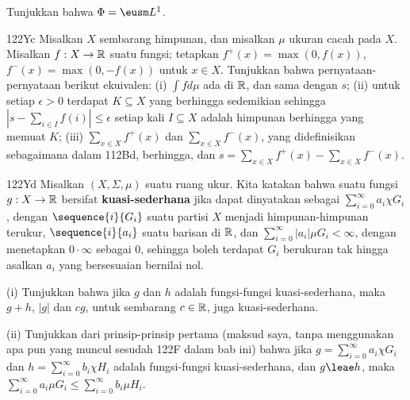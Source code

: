 {

\noindent Tunjukkan bahwa $\Phi=\eusm L^1$. 

\spheader 122Yc Misalkan $X$ sembarang himpunan, dan misalkan $\mu$
ukuran cacah pada $X$. Misalkan $f:X\to\Bbb R$ suatu fungsi; tetapkan
$f^+(x)=\max(0,f(x))$, $f^-(x)=\max(0,-f(x))$ untuk $x\in X$.
Tunjukkan bahwa pernyataan-pernyataan berikut ekuivalen: (i)
$\int fd\mu$ ada di $\Bbb R$, dan sama dengan $s$; (ii) untuk setiap
$\epsilon>0$ terdapat $K\subseteq X$ yang berhingga sedemikian sehingga
$|s-\sum_{i\in I}f(i)|\le\epsilon$ setiap kali $I\subseteq X$ adalah
himpunan berhingga yang memuat $K$; (iii) $\sum_{x\in X}f^+(x)$ dan
$\sum_{x\in X}f^-(x)$, yang didefinisikan sebagaimana dalam 112Bd,
berhingga, dan
$s=\sum_{x\in X}f^+(x)-\sum_{x\in X}f^-(x)$.

\spheader 122Yd Misalkan $(X,\Sigma,\mu)$ suatu ruang ukur. Kita katakan
bahwa suatu fungsi $g:X\to\Bbb R$ bersifat {\bf kuasi-sederhana} jika
dapat dinyatakan sebagai $\sum_{i=0}^{\infty}a_i\chi G_i$, dengan
$\sequence{i}{G_i}$ suatu partisi $X$ menjadi himpunan-himpunan terukur,
$\sequence{i}{a_i}$ suatu barisan di $\Bbb R$, dan
$\sum_{i=0}^{\infty}|a_i|\mu G_i<\infty$, dengan menetapkan
$0\cdot\infty$ sebagai $0$, sehingga boleh terdapat $G_i$ berukuran tak
hingga asalkan $a_i$ yang bersesuaian bernilai nol.

\quad(i) Tunjukkan bahwa jika $g$ dan $h$ adalah fungsi-fungsi
kuasi-sederhana, maka $g+h$, $|g|$ dan $cg$, untuk sembarang
$c\in \Bbb R$, juga kuasi-sederhana. 

\quad(ii) Tunjukkan dari prinsip-prinsip pertama (maksud saya, tanpa
menggunakan apa pun yang muncul sesudah 122F dalam bab ini) bahwa jika
$g=\sum_{i=0}^{\infty}a_i\chi G_i$ dan
$h=\sum_{i=0}^{\infty}b_i\chi H_i$ adalah fungsi-fungsi kuasi-sederhana,
dan $g\leae h$, maka
$\sum_{i=0}^{\infty}a_i\mu G_i\le\sum_{i=0}^{\infty}b_i\mu H_i$.

}

